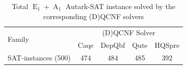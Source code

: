 \documentclass[runningheads]{llncs}
\DeclareMathOperator{\Aaut}{A}
\DeclareMathOperator{\Eaut}{E}
\begin{document}
\begin{table}
	\caption{Total $\Eaut_1+\Aaut_1$ Autark-SAT instance solved by the corresponding (D)QCNF solvers}\label{tab:sat-solver}
	\begin{tabular}{l|c|c|c|c}

		\hline
		\multirow{2}{3cm}{Family}  & \multicolumn{4}{c}{(D)QCNF Solver} \\
		\cline{2-5}
		& Caqe & DepQbf & Qute & HQSpre  \\

		\hline

		SAT-instances (500) &  474 & 484 & 485 & 392 \\

		\hline
	\end{tabular}
\end{table}
\end{document}
